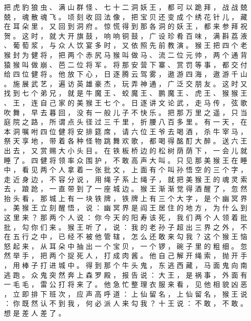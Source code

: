 {把 虎 豹 狼 虫 、 满 山 群 怪 、 七 十 二 洞 妖 王 ， 都 可 以 跪 拜 ， 战 战 兢 兢 ， 魂 散 魂 飞 。
顷 刻 收 回 法 像 ， 把 宝 贝 还 变 成 个 绣 花 针 儿 ， 藏 在 耳 朵 里 ， 又 回 到 洞 府 。
惊 慌 得 到 那 各 洞 的 妖 王 ， 都 来 参 拜 祝 贺 。
这 时 ， 就 大 开 旗 鼓 ， 响 响 铜 鼓 ， 广 设 珍 肴 百 味 ， 满 斟 荔 液 、 葡 萄 浆 ， 与 众 人 饮 宴 多 时 ， 又 依 照 先 前 教 演 。
猴 王 把 四 个 老 猴 封 为 健 将 ， 把 两 个 赤 尻 马 猴 叫 做 马 、 流 二 位 元 帅 ， 两 个 通 背 猿 猴 叫 做 崩 、 芭 二 位 将 军 。
将 那 安 营 下 寨 、 赏 罚 等 事 ， 都 交 付 给 四 位 健 将 。
他 放 下 心 ， 日 逐 腾 云 驾 雾 ， 遨 游 四 海 ， 遨 游 千 山 。
施 展 武 艺 ， 遍 访 英 雄 豪 杰 ， 玩 弄 神 通 ， 广 泛 交 朋 友 。
这 时 又 找 到 七 个 弟 兄 ， 就 是 牛 魔 王 、 蛟 魔 王 、 鹏 魔 王 、 虎 王 、 猴 猴 王 、 王 ， 连 自 己 家 的 美 猴 王 七 个 。
日 逐 讲 文 论 武 ， 走 马 传 ， 弦 歌 吹 舞 ， 早 去 暮 回 ， 没 有 一 般 儿 子 不 快 乐 。
把 那 万 里 之 遥 ， 只 当 庭 院 之 路 ， 所 谓 点 头 径 过 三 千 里 ， 折 腰 八 百 多 里 。
有 一 天 ， 在 本 洞 嘱 咐 四 位 健 将 安 排 筵 席 ， 请 六 位 王 爷 去 喝 酒 ， 杀 牛 宰 马 ， 祭 天 享 地 ， 带 着 各 种 怪 物 跳 舞 欢 歌 ， 都 喝 得 酩 酊 大 醉 。
送 六 王 出 去 ， 又 赏 赐 大 小 头 目 。
在 铁 板 桥 边 的 松 树 荫 荫 下 ， 一 会 儿 就 睡 了 。
四 健 将 领 率 众 围 护 ， 不 敢 高 声 大 叫 。
只 见 那 美 猴 王 在 睡 中 ， 看 见 两 个 人 拿 着 一 张 批 文 ， 上 面 有 个 叫 孙 悟 空 的 三 个 字 ， 走 近 身 边 ， 不 容 分 说 ， 用 绳 子 系 上 绳 子 ， 就 把 美 猴 王 的 魂 灵 索 去 ， 踉 跄 ， 一 直 带 到 了 一 座 城 边 。
猴 王 渐 渐 觉 得 酒 醒 了 ， 忽 然 抬 头 看 ， 那 城 上 有 一 块 铁 牌 ， 铁 牌 上 有 三 个 大 字 ， 是 个 幽 冥 界 。
美 猴 王 立 刻 醒 悟 ， 说 ： 幽 冥 界 是 阎 王 居 住 的 地 方 ， 为 什 么 到 这 里 来 ？ 那 两 个 人 说 ： 你 今 天 的 阳 寿 该 死 ， 我 们 两 个 人 领 着 批 批 ， 勾 你 们 来 。
猴 王 听 了 ， 说 ： 我 的 老 孙 子 超 出 三 界 之 外 ， 不 在 五 行 之 中 ， 已 经 不 被 他 管 辖 ， 怎 么 还 敢 来 勾 我 ？
这 个 猴 王 恼 怒 起 来 ， 从 耳 朵 中 抽 出 一 个 宝 贝 ， 一 个 锣 ， 碗 子 里 的 粗 细 。
忽 然 举 手 ， 把 两 个 捉 死 人 ， 打 成 肉 酱 。
他 自 己 解 开 绳 索 ， 抛 开 手 ， 用 棒 子 打 进 城 中 。
得 到 那 个 牛 头 鬼 ， 东 逃 西 藏 ， 马 面 鬼 向 南 逃 跑 。
众 鬼 突 然 奔 上 森 罗 殿 ， 报 告 说 ： 大 王 ， 是 祸 事 ， 外 面 有 一 毛 毛 ， 雷 公 打 将 来 了 。
他 急 忙 整 理 衣 服 来 看 ， 见 他 相 貌 凶 恶 ， 立 即 排 下 班 次 ， 应 声 高 呼 道 ： 上 仙 留 名 ， 上 仙 留 名 ， 猴 王 说 ： 你 既 然 认 不 到 我 ， 何 必 派 人 来 勾 我 ？ 十 王 说 ： 不 敢 ， 不 敢 。
想 是 差 人 差 了 。
}
